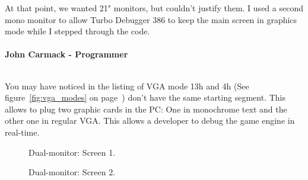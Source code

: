 \documentclass[book.tex]{subfiles}
\begin{document}
\begin{fancyquotes}
At that point, we wanted 21" monitors, but couldn't justify them.  I used a second mono monitor to allow Turbo Debugger 386 to keep the main screen in graphics mode while I stepped through the code.\\
 \\
\textbf{John Carmack - Programmer}
\end{fancyquotes}
\\
You may have noticed in the listing of VGA mode 13h and 4h (See figure~\ref{fig:vga_modes} on page~\pageref{fig:vga_modes})  don't have the same starting segment. This allows to plug two graphic cards in the PC: One in monochrome text and the other one in regular VGA. This allows a developer to debug the game engine in real-time.\\
\begin{figure}[H]
\centering
\caption{Dual-monitor: Screen 1.}
\label{fig:dm1}
\end{figure}

\begin{figure}[H]
\centering
\caption{Dual-monitor: Screen 2.}
\label{fig:dm1}
\end{figure}
\end{document}
